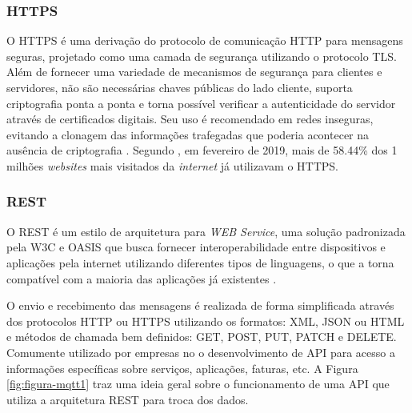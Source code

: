        \subsubsection{HTTPS}
        \label{sec:https}
        O \gls{HTTPS} é uma derivação do protocolo de comunicação \gls{HTTP} para mensagens seguras, projetado como uma camada de segurança utilizando o protocolo \gls{TLS}. Além de fornecer uma variedade de mecanismos de segurança para clientes e servidores, não são necessárias chaves públicas do lado cliente, suporta criptografia ponta a ponta e torna possível verificar a autenticidade do servidor através de certificados digitais. Seu uso é recomendado em redes inseguras, evitando a clonagem das informações trafegadas que poderia acontecer na ausência de criptografia \cite{HTTPS}. Segundo \cite{usoHTTPS}, em fevereiro de 2019, mais de 58.44\% dos 1 milhões \textit{websites} mais visitados da \textit{internet} já utilizavam o \gls{HTTPS}.
        
        \subsubsection{REST}
        \label{sec:rest}

        O \gls{REST} é um estilo de arquitetura para \textit{\gls{WEB} Service},  uma solução padronizada pela \gls{W3C} e \gls{OASIS} que busca fornecer interoperabilidade entre dispositivos e aplicações pela internet utilizando diferentes tipos de linguagens, o que a torna compatível com a maioria das aplicações já existentes \cite{W3C}.
        
        O envio e recebimento das mensagens é realizada de forma simplificada através dos protocolos \gls{HTTP} ou \gls{HTTPS} utilizando os formatos: \gls{XML}, \gls{JSON} ou \gls{HTML} e métodos de chamada bem definidos: GET, POST, PUT, PATCH e DELETE. Comumente utilizado por empresas no o desenvolvimento de \gls{API} para acesso a informações específicas sobre serviços, aplicações, faturas, etc. A Figura \ref{fig:figura-mqtt1} traz uma ideia geral sobre o funcionamento de uma API que utiliza a arquitetura REST para troca dos dados.
            
            \begin{figure}[!h]
    	    \end{figure}
    	
